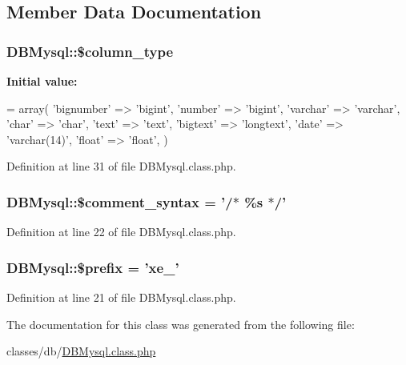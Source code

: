 \subsection{Member Data Documentation}
\hypertarget{classDBMysql_aa93c8f5f14304a16864a0708a3ba41b0}{
\subsubsection[{\$column\+\_\+type}]{\setlength{\rightskip}{0pt plus 5cm}D\+B\+Mysql\+::\$column\+\_\+type}}\label{classDBMysql_aa93c8f5f14304a16864a0708a3ba41b0}
{\bfseries Initial value\+:}
\begin{DoxyCode}
= array(
        \textcolor{stringliteral}{'bignumber'} => \textcolor{stringliteral}{'bigint'},
        \textcolor{stringliteral}{'number'} => \textcolor{stringliteral}{'bigint'},
        \textcolor{stringliteral}{'varchar'} => \textcolor{stringliteral}{'varchar'},
        \textcolor{stringliteral}{'char'} => \textcolor{stringliteral}{'char'},
        \textcolor{stringliteral}{'text'} => \textcolor{stringliteral}{'text'},
        \textcolor{stringliteral}{'bigtext'} => \textcolor{stringliteral}{'longtext'},
        \textcolor{stringliteral}{'date'} => \textcolor{stringliteral}{'varchar(14)'},
        \textcolor{stringliteral}{'float'} => \textcolor{stringliteral}{'float'},
    )
\end{DoxyCode}


Definition at line 31 of file D\+B\+Mysql.\+class.\+php.

\hypertarget{classDBMysql_a2c00f6e29c9e4fc4a532f806cf4313c2}{
\subsubsection[{\$comment\+\_\+syntax}]{\setlength{\rightskip}{0pt plus 5cm}D\+B\+Mysql\+::\$comment\+\_\+syntax = '/$\ast$ \%s $\ast$/'}}\label{classDBMysql_a2c00f6e29c9e4fc4a532f806cf4313c2}


Definition at line 22 of file D\+B\+Mysql.\+class.\+php.

\hypertarget{classDBMysql_ac95b2047c4c75730e0533be0cccd19d9}{
\subsubsection[{\$prefix}]{\setlength{\rightskip}{0pt plus 5cm}D\+B\+Mysql\+::\$prefix = 'xe\+\_\+'}}\label{classDBMysql_ac95b2047c4c75730e0533be0cccd19d9}


Definition at line 21 of file D\+B\+Mysql.\+class.\+php.



The documentation for this class was generated from the following file\+:\begin{DoxyCompactItemize}
\item 
classes/db/\hyperlink{DBMysql_8class_8php}{D\+B\+Mysql.\+class.\+php}\end{DoxyCompactItemize}

